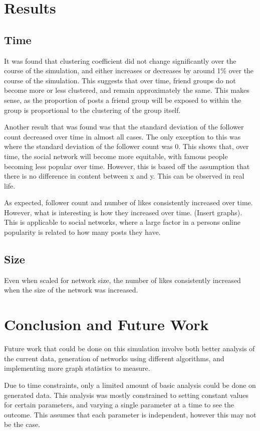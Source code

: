 \documentclass{article}
\begin{document}
\section{Results}

\subsection{Time}
It was found that clustering coefficient did not change significantly over the
course of the simulation, and either increases or decreases by around 1\% over the course of the simulation.
This suggests that over time, friend groups do not become more or less clustered, and remain approximately the same.
This makes sense, as the proportion of posts a friend group will be exposed to within the group
is proportional to the clustering of the group itself.

Another result that was found was that the standard deviation of the follower count
decreased over time in almost all cases. The only exception to this was where the
standard deviation of the follower count was 0. This shows that, over time, the
social network will become more equitable, with famous people becoming less popular
over time. However, this is based off the assumption that there is no difference
in content between x and y. This can be observed in real life.

As expected, follower count and number of likes consistently increased over time.
However, what is interesting is how they increased over time. (Insert graphs).
This is applicable to social networks, where a large factor in a persons online popularity
is related to how many posts they have.

\subsection{Size}
Even when scaled for network size, the number of likes consistently increased
when the size of the network was increased.

\section{Conclusion and Future Work}

Future work that could be done on this simulation involve both better
analysis of the current data, generation of networks using different algorithms,
and implementing more graph statistics to measure.

Due to time constraints, only a limited amount of basic analysis could be done
on generated data. This analysis was mostly constrained to setting constant values for certain
parameters, and varying a single parameter at a time to see the outcome.
This assumes that each parameter is independent, however this may not be the case.
\end{document}
